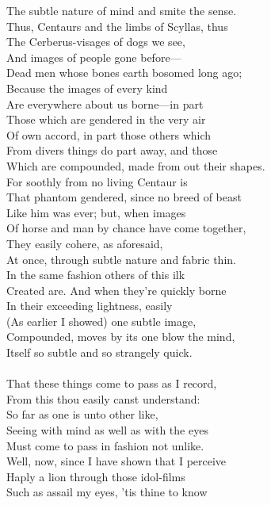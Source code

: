 The subtle nature of mind and smite the sense.\\
Thus, Centaurs and the limbs of Scyllas, thus\\
The Cerberus-visages of dogs we see,\\
And images of people gone before—\\
Dead men whose bones earth bosomed long ago;\\
Because the images of every kind\\
Are everywhere about us borne—in part\\
Those which are gendered in the very air\\
Of own accord, in part those others which\\
From divers things do part away, and those\\
Which are compounded, made from out their shapes.\\
For soothly from no living Centaur is\\
That phantom gendered, since no breed of beast\\
Like him was ever; but, when images\\
Of horse and man by chance have come together,\\
They easily cohere, as aforesaid,\\
At once, through subtle nature and fabric thin.\\
In the same fashion others of this ilk\\
Created are. And when they're quickly borne\\
In their exceeding lightness, easily\\
(As earlier I showed) one subtle image,\\
Compounded, moves by its one blow the mind,\\
Itself so subtle and so strangely quick.\\
\\
That these things come to pass as I record,\\
From this thou easily canst understand:\\
So far as one is unto other like,\\
Seeing with mind as well as with the eyes\\
Must come to pass in fashion not unlike.\\
Well, now, since I have shown that I perceive\\
Haply a lion through those idol-films\\
Such as assail my eyes, 'tis thine to know\\

